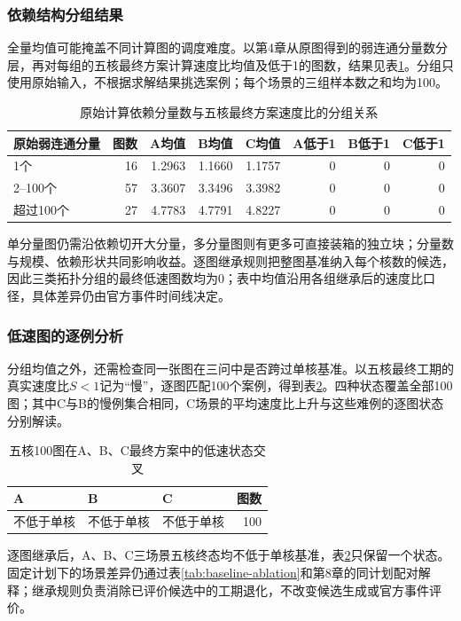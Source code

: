 \subsubsection{依赖结构分组结果}
全量均值可能掩盖不同计算图的调度难度。以第4章从原图得到的弱连通分量数分层，再对每组的五核最终方案计算速度比均值及低于1的图数，结果见表\ref{tab:topology-speedup}。分组只使用原始输入，不根据求解结果挑选案例；每个场景的三组样本数之和均为100。
\begin{table}[H]\centering\small
\caption{原始计算依赖分量数与五核最终方案速度比的分组关系}\label{tab:topology-speedup}
\setlength{\tabcolsep}{4pt}
\begin{tabular}{lrrrrrrr}\toprule
原始弱连通分量 & 图数 & A均值 & B均值 & C均值 & A低于1 & B低于1 & C低于1\\\midrule
1个 & 16 & 1.2963 & 1.1660 & 1.1757 & 0 & 0 & 0\\
2--100个 & 57 & 3.3607 & 3.3496 & 3.3982 & 0 & 0 & 0\\
超过100个 & 27 & 4.7783 & 4.7791 & 4.8227 & 0 & 0 & 0\\\bottomrule
\end{tabular}\end{table}

单分量图仍需沿依赖切开大分量，多分量图则有更多可直接装箱的独立块；分量数与规模、依赖形状共同影响收益。逐图继承规则把整图基准纳入每个核数的候选，因此三类拓扑分组的最终低速图数均为0；表中均值沿用各组继承后的速度比口径，具体差异仍由官方事件时间线决定。

\subsubsection{低速图的逐例分析}
分组均值之外，还需检查同一张图在三问中是否跨过单核基准。以五核最终工期的真实速度比$S<1$记为“慢”，逐图匹配100个案例，得到表\ref{tab:slow-transition}。四种状态覆盖全部100图；其中C与B的慢例集合相同，C场景的平均速度比上升与这些难例的逐图状态分别解读。
\begin{table}[H]\centering\small
\caption{五核100图在A、B、C最终方案中的低速状态交叉}\label{tab:slow-transition}
\begin{tabular}{lllr}\toprule
A & B & C & 图数\\\midrule
不低于单核 & 不低于单核 & 不低于单核 & 100\\\bottomrule
\end{tabular}\end{table}

逐图继承后，A、B、C三场景五核终态均不低于单核基准，表\ref{tab:slow-transition}只保留一个状态。固定计划下的场景差异仍通过表\ref{tab:baseline-ablation}和第8章的同计划配对解释；继承规则负责消除已评价候选中的工期退化，不改变候选生成或官方事件评价。

